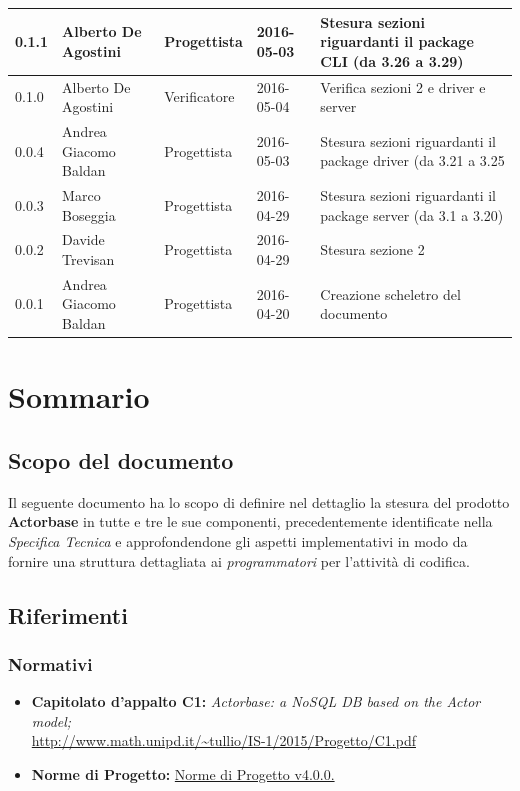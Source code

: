 \documentclass{scalatekids-article}
\begin{document}
\begin{center}
\begin{longtable}{| l | l | l | l | p{5cm} |}
    \hline
    0.1.1 & Alberto De Agostini & Progettista & 2016-05-03 & Stesura sezioni riguardanti il package CLI (da 3.26 a 3.29)\\
    \hline
    0.1.0 & Alberto De Agostini & Verificatore & 2016-05-04 & Verifica sezioni 2 e driver e server\\
    \hline
    0.0.4 & Andrea Giacomo Baldan & Progettista & 2016-05-03 & Stesura sezioni riguardanti il package driver (da 3.21 a 3.25\\
    \hline
    0.0.3 & Marco Boseggia & Progettista & 2016-04-29 & Stesura sezioni riguardanti il package server (da 3.1 a 3.20)\\
    \hline
    0.0.2 & Davide Trevisan & Progettista & 2016-04-29 & Stesura sezione 2\\
    \hline
    0.0.1 & Andrea Giacomo Baldan & Progettista & 2016-04-20 & Creazione scheletro del documento\\
    \hline
  \end{longtable}
\end{center}
\newpage
\tableofcontents
\newpage
{}

\section{Sommario}

\subsection{Scopo del documento}

Il seguente documento ha lo scopo di definire nel dettaglio la stesura del
prodotto \textbf{Actorbase} in tutte e tre le sue componenti, precedentemente
identificate nella \textit{Specifica Tecnica} e approfondendone gli aspetti
implementativi in modo da fornire una struttura dettagliata ai
\textit{programmatori} per l'attività di codifica.

\prodPurpose

\glossExpl

\subsection{Riferimenti}

\subsubsection{Normativi}

\begin{itemize}

\item\textbf{Capitolato d'appalto C1:} \textit{Actorbase: a NoSQL DB based on the Actor model;}\\
  \url{http://www.math.unipd.it/~tullio/IS-1/2015/Progetto/C1.pdf}
\item\textbf{Norme di Progetto:}
  \href{run:../Interni/NormeDiProgetto\_v4.0.0.pdf}{Norme di Progetto v4.0.0.}
\end{itemize}
\end{document}
